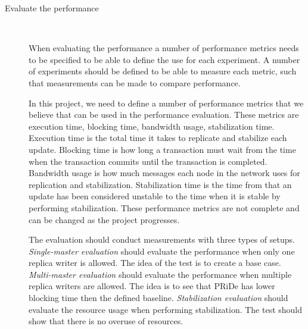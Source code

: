 \begin{description}
	\item[Evaluate the performance] \

	When evaluating the performance a number of performance metrics needs to be specified to be able to define the use for each experiment. A number of experiments should be defined to be able to measure each metric, such that measurements can be made to compare performance.  
	
	In this project, we need to define a number of performance metrics that we believe that can be used in the performance evaluation. These metrics are execution time, blocking time, bandwidth usage, stabilization time. Execution time is the total time it takes to replicate and stabilize each update. Blocking time is how long a transaction must wait from the time when the transaction commits until the transaction is completed. Bandwidth usage is how much messages each node in the network uses for replication and stabilization. Stabilization time is the time from that an update has been considered unstable to the time when it is stable by performing stabilization. These performance metrics are not complete and can be changed as the project progresses.
 
The evaluation should conduct measurements with three types of setups. \emph{Single-master evaluation} should evaluate the performance when only one replica writer is allowed. The idea of the test is to create a base case. \emph{Multi-master evaluation} should evaluate the performance when multiple replica writers are allowed. The idea is to see that PRiDe has lower blocking time then the defined baseline. \emph{Stabilization evaluation} should evaluate the resource usage when performing stabilization. The test should show that there is no overuse of resources.  

\end{description}
